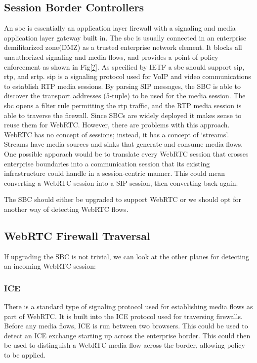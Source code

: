 \subsection{Session Border Controllers}
An \gls{sbc} is essentially an application layer firewall with a signaling and media application layer gateway built in. The \gls{sbc} is usually connected in an enterprise demilitarized zone(DMZ) as a trusted enterprise network element. It blocks all unauthorized signaling and media flows, and provides a point of policy enforcement as shown in Fig\ref{?}. As specified by IETF\cite{sbc} a \gls{sbc} should support \gls{sip}, \gls{rtp}, and \gls{srtp}. \gls{sip} is a signaling protocol used for VoIP and video communications to establish RTP media sessions. By parsing SIP messages, the SBC is able to discover the transport addresses (5-tuple) to be used for the media session. The \gls{sbc} opens a filter rule permitting the \gls{rtp} traffic, and the RTP media session is able to traverse the firewall. Since SBCs are widely deployed it makes sense to reuse them for WebRTC. However, there are problems with this approach. WebRTC has no concept of sessions; instead, it has a concept of `streams'. Streams have media sources and sinks that generate and consume media flows. One possible apporach would be to translate every WebRTC session that crosses enterprise boundaries into a communication session that its existing infrastructure could handle in a session-centric manner. This could mean converting a WebRTC session into a SIP session, then converting back again.

The SBC should either be upgraded to support WebRTC or we should opt for another way of detecting WebRTC flows.

\subsection{WebRTC Firewall Traversal}
If upgrading the SBC is not trivial, we can look at the other planes for detecting an incoming WebRTC session:

\subsubsection{ICE}
There is a standard type of signaling protocol used for establishing media flows as part of WebRTC. It is built into the ICE protocol used for traversing firewalls. Before any media flows, ICE is run between two browsers. This could be used to detect an ICE exchange starting up across the enterprise border. This could then be used to distinguish a WebRTC media flow across the border, allowing policy to be applied.

